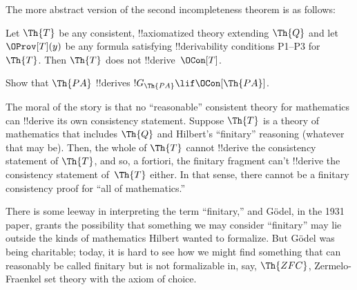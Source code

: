 \documentclass[../../../include/open-logic-section]{subfiles}
\begin{document}
The more abstract version of the second incompleteness theorem is as follows:

\begin{thm}
 Let $\Th{T}$ be any
consistent, !!{axiomatized} theory extending $\Th{Q}$ and let
$\OProv[T](y)$ be any formula satisfying !!{derivability} conditions
P1--P3 for~$\Th{T}$. Then $\Th{T}$ does not !!{derive}~$\OCon[T]$.
\end{thm}

\begin{prob}
Show that $\Th{PA}$ !!{derive}s $!G_{\Th{PA}} \lif \OCon[\Th{PA}]$.
\end{prob}

\begin{digress}
The moral of the story is that no ``reasonable'' consistent theory for
mathematics can !!{derive} its own consistency statement. Suppose
$\Th{T}$ is a theory of mathematics that includes $\Th{Q}$ and
Hilbert's ``finitary'' reasoning (whatever that may be). Then, the
whole of $\Th{T}$ cannot !!{derive} the consistency statement of
$\Th{T}$, and so, a fortiori, the finitary fragment can't !!{derive}
the consistency statement of~$\Th{T}$ either. In that sense, there
cannot be a finitary consistency proof for ``all of mathematics.''

There is some leeway in interpreting the term ``finitary,'' and
G\"odel, in the 1931 paper, grants the possibility that something we
may consider ``finitary'' may lie outside the kinds of mathematics
Hilbert wanted to formalize. But G\"odel was being charitable; today,
it is hard to see how we might find something that can reasonably be
called finitary but is not formalizable in, say, $\Th{ZFC}$,
Zermelo-Fraenkel set theory with the axiom of choice.
\end{digress}
\end{document}
